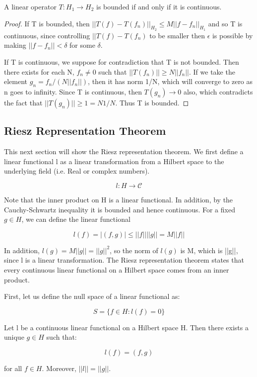 \documentclass[class=article, crop=false]{standalone}
\begin{document}
		\begin{proposition} 
			A linear operator $T: H_1 \rightarrow H_2$ is bounded if and only if it is continuous.
		\end{proposition}
		\begin{proof}
			If T is bounded, then $||T(f) - T(f_n)||_{H_2} \le M||f - f_n||_{H_1}$ and so T is continuous, since controlling $||T(f) - T(f_n)$ to be smaller then $\epsilon$ is possible by making $||f - f_n|| < \delta$ for some $\delta$.

			If T is continuous, we suppose for contradiction that T is not bounded. Then there exists for each N, $f_n \neq 0$ such that $||T(f_n)|| \ge N ||f_n||$. If we take the element $g_n = f_n / (N ||f_n||)$, then it has norm 1/N, which will converge to zero as n goes to infinity. Since T is continuous, then $T(g_n) \rightarrow 0$ also, which contradicts the fact that $||T(g_n)|| \ge 1 = N 1/N$. Thus T is bounded.
		\end{proof}

	\subsection{Riesz Representation Theorem}
		This next section will show the Riesz representation theorem. We first define a linear functional l as a linear transformation from a Hilbert space to the underlying field (i.e. Real or complex numbers).

			$$l: H \rightarrow \mathcal{C}$$

		Note that the inner product on H is a linear functional. In addition, by the Cauchy-Schwartz inequality it is bounded and hence continuous. For a fixed $g \in H$, we can define the linear functional

			$$l(f) = |(f,g)| \le ||f||||g|| = M||f||$$

		In addition, $l(g) = M||g|| = ||g||^2$, so the norm of $l(g) $ is M, which is ||g||, since l is a linear transformation. The Riesz representation theorem states that every continuous linear functional on a Hilbert space comes from an inner product. 

		First, let us define the null space of a linear functional as:

			$$S = \{f \in H: l(f) = 0\}$$

		\begin{theorem} 
			Let l be a continuous linear functional on a Hilbert space H. Then there exists a unique $g \in H$ such that:

				$$l(f) = (f, g)$$

			for all $f \in H$. Moreover, $||l|| = ||g||$.
		\end{theorem}
\end{document}
